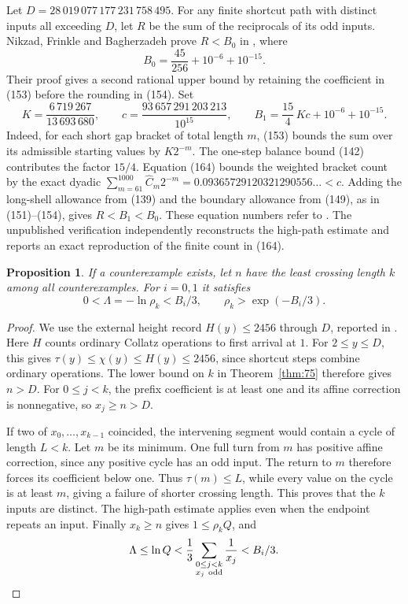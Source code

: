 \documentclass[11pt,a4paper]{article}
\theoremstyle{plain}\newtheorem{theorem}{Theorem}\newtheorem{proposition}[theorem]{Proposition}
\theoremstyle{definition}\newtheorem{example}[theorem]{Example}
\theoremstyle{remark}\newtheorem{remark}[theorem]{Remark}
\begin{document}
Let $D=28\,019\,077\,177\,231\,758\,495$. For any finite shortcut path with distinct
inputs all exceeding $D$, let $R$ be the sum of the reciprocals of its odd inputs.
Nikzad, Frinkle and Bagherzadeh prove $R<B_0$ in \cite[Theorem~1A.1]{nfb2026}, where
\[
 B_0=\frac{45}{256}+10^{-6}+10^{-15}.
\]
Their proof gives a second rational upper bound by retaining the coefficient in (153)
before the rounding in (154). Set
\[
 K=\frac{6\,719\,267}{13\,693\,680},\qquad
 c=\frac{93\,657\,291\,203\,213}{10^{15}},\qquad
 B_1=\frac{15}{4}\,Kc+10^{-6}+10^{-15}.
\]
Indeed, for each short gap bracket of total length $m$, (153) bounds the sum over
its admissible starting values by $K2^{-m}$. The one-step balance bound (142) contributes
the factor $15/4$. Equation (164) bounds the weighted bracket count by the exact dyadic
$\sum_{m=61}^{1000}\widehat C_m2^{-m}=0.09365729120321290556\ldots<c$.
Adding the long-shell allowance from (139) and the boundary allowance from (149),
as in (151)--(154), gives $R<B_1<B_0$. These equation numbers refer to \cite{nfb2026}.
The unpublished verification \cite{dj-indep2026} independently reconstructs the high-path
estimate and reports an exact reproduction of the finite count in (164).

\begin{proposition}\label{prop:recip}
If a counterexample exists, let $n$ have the least crossing length $k$ among all
counterexamples. For $i=0,1$ it satisfies
\[
 0<\Lambda=-\ln\rho_k < B_i/3,\qquad
 \rho_k>\exp(-B_i/3).
\]
\end{proposition}
\begin{proof}
We use the external height record $H(y)\le2456$ through $D$, reported in
\cite[eq.~(34)]{nfb2026}. Here $H$ counts ordinary Collatz operations to first arrival
at $1$. For $2\le y\le D$, this gives $\tau(y)\le\chi(y)\le H(y)\le2456$, since
shortcut steps combine ordinary operations. The lower bound on $k$ in Theorem~\ref{thm:75} therefore gives $n>D$.
For $0\le j<k$, the prefix coefficient is at least one and its affine correction
is nonnegative, so $x_j\ge n>D$.

If two of $x_0,\ldots,x_{k-1}$ coincided, the intervening segment would contain a
cycle of length $L<k$. Let $m$ be its minimum. One full turn from $m$ has positive
affine correction, since any positive cycle has an odd input. The return to $m$
therefore forces its coefficient below one. Thus $\tau(m)\le L$, while every
value on the cycle is at least $m$, giving a failure of shorter crossing length.
This proves that the $k$ inputs are distinct. The high-path estimate applies even
when the endpoint repeats an input. Finally $x_k\ge n$ gives $1\le\rho_k Q$, and
\[
 \Lambda\le\ln Q<\frac13\sum_{\substack{0\le j<k\\x_j\ {\rm odd}}}\frac1{x_j}
 < B_i/3.
\]
\end{proof}
\end{document}
